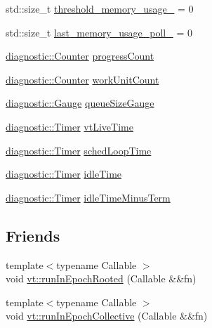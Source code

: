 \begin{DoxyCompactItemize}
\item 
std\+::size\+\_\+t \hyperlink{structvt_1_1sched_1_1_scheduler_a034c9560a2d4d8f60b3ddab063abe16d}{threshold\+\_\+memory\+\_\+usage\+\_\+} = 0
\item 
std\+::size\+\_\+t \hyperlink{structvt_1_1sched_1_1_scheduler_a54f31a009c8abdf8b9f220832b25f668}{last\+\_\+memory\+\_\+usage\+\_\+poll\+\_\+} = 0
\item 
\hyperlink{namespacevt_1_1diagnostic_a55fcc9d6ffa285d1b085c01df2507d2f}{diagnostic\+::\+Counter} \hyperlink{structvt_1_1sched_1_1_scheduler_acb82ca3c712cf5c36bce05c2ef8b53ad}{progress\+Count}
\item 
\hyperlink{namespacevt_1_1diagnostic_a55fcc9d6ffa285d1b085c01df2507d2f}{diagnostic\+::\+Counter} \hyperlink{structvt_1_1sched_1_1_scheduler_a1b22d8a8efd0cb27fdba01ae616e060b}{work\+Unit\+Count}
\item 
\hyperlink{namespacevt_1_1diagnostic_ad68069af499e2047c28d1852d77680ee}{diagnostic\+::\+Gauge} \hyperlink{structvt_1_1sched_1_1_scheduler_afd3dfb9290dd31015056f4a89e447325}{queue\+Size\+Gauge}
\item 
\hyperlink{namespacevt_1_1diagnostic_a84795feb3d3500ee2d7d59248499efb8}{diagnostic\+::\+Timer} \hyperlink{structvt_1_1sched_1_1_scheduler_adce0ae8437702f0aa29cbdea4fd58a12}{vt\+Live\+Time}
\item 
\hyperlink{namespacevt_1_1diagnostic_a84795feb3d3500ee2d7d59248499efb8}{diagnostic\+::\+Timer} \hyperlink{structvt_1_1sched_1_1_scheduler_a89fb2b5f6ab5c29aed1db7a6a924eb13}{sched\+Loop\+Time}
\item 
\hyperlink{namespacevt_1_1diagnostic_a84795feb3d3500ee2d7d59248499efb8}{diagnostic\+::\+Timer} \hyperlink{structvt_1_1sched_1_1_scheduler_a5ccba45f9944b59236f7802f974b252e}{idle\+Time}
\item 
\hyperlink{namespacevt_1_1diagnostic_a84795feb3d3500ee2d7d59248499efb8}{diagnostic\+::\+Timer} \hyperlink{structvt_1_1sched_1_1_scheduler_a86c062f0d1dce9656dce8af9875cee73}{idle\+Time\+Minus\+Term}
\end{DoxyCompactItemize}
\subsection*{Friends}
\begin{DoxyCompactItemize}
\item 
{\footnotesize template$<$typename Callable $>$ }\\void \hyperlink{structvt_1_1sched_1_1_scheduler_a792343e9a39ba8661b35c3c9e55f3541}{vt\+::run\+In\+Epoch\+Rooted} (Callable \&\&fn)
\item 
{\footnotesize template$<$typename Callable $>$ }\\void \hyperlink{structvt_1_1sched_1_1_scheduler_a71bf858d697b14435f4b7e525d2dffde}{vt\+::run\+In\+Epoch\+Collective} (Callable \&\&fn)
\end{DoxyCompactItemize}
